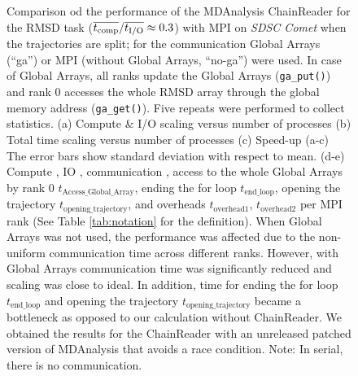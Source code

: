 \begin{figure}[ht!]
\caption{Comparison od the performance of the MDAnalysis ChainReader for the RMSD task ($\overline{{t}_{\text{comp}}}/\overline{{t}_{\text{I/O}}} \approx 0.3$)  with MPI on \emph{SDSC Comet} when the trajectories are split; for the communication Global Arrays (``ga'') or MPI (without Global Arrays, ``no-ga'') were used.
In case of Global Arrays, all ranks update the Global Arrays (\texttt{ga\_put()}) and rank 0 accesses the whole RMSD array through the global memory address (\texttt{ga\_get()}).
Five repeats were performed to collect statistics. (a) Compute \& I/O scaling versus number of processes (b) Total time scaling versus number of processes (c) Speed-up (a-c) The error bars show standard deviation with respect to mean. (d-e) Compute \tcomp, IO \tIO, communication \tcomm, access to the whole Global Arrays by rank 0 $t_{\text{Access\_Global\_Array}}$, ending the for loop $t_{\text{end\_loop}}$,
  opening the trajectory $t_{\text{opening\_trajectory}}$, and overheads $t_{\text{overhead1}}$, $t_{\text{overhead2}}$ per MPI rank (See Table \ref{tab:notation} for the definition). When Global Arrays was not used, the performance was affected due to the non-uniform communication time across different ranks. However, with Global Arrays communication time was significantly reduced and scaling was close to ideal. In addition, time for ending the for loop $t_{\text{end\_loop}}$ and 
opening the trajectory $t_{\text{opening\_trajectory}}$ became a bottleneck as opposed to our calculation without ChainReader. We obtained the results for the ChainReader with an unreleased patched version of MDAnalysis that avoids a race condition. Note: In serial, there is no communication.}
\label{fig:MPIwithIO-split-chain-reader}
\end{figure}

